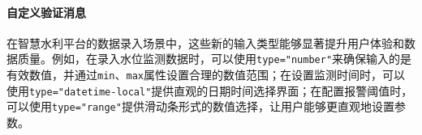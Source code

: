 \begin{Shaded}
\begin{Highlighting}[]
\DataTypeTok{\textless{}}\OperatorTok{=}\OperatorTok{=}\DataTypeTok{\textgreater{}}

\DataTypeTok{\textless{}}\OperatorTok{=}\OperatorTok{=}\OperatorTok{=}\OperatorTok{=}\DataTypeTok{\textgreater{}}

\DataTypeTok{\textless{}}\OperatorTok{=}\OtherTok{ }
\OperatorTok{=}\OtherTok{ }
\OperatorTok{=}\OtherTok{ }
\OperatorTok{=}\DataTypeTok{\textgreater{}}
\end{Highlighting}
\end{Shaded}

\paragraph{自定义验证消息}\label{ux81eaux5b9aux4e49ux9a8cux8bc1ux6d88ux606f}

\begin{Shaded}
\begin{Highlighting}[]
\DataTypeTok{\textless{}}\OperatorTok{=}\OtherTok{ }
\OperatorTok{=}\OtherTok{ }
\OperatorTok{=}\OtherTok{ }
\OperatorTok{=}
\OperatorTok{=}\DataTypeTok{\textgreater{}}
\end{Highlighting}
\end{Shaded}

在智慧水利平台的数据录入场景中，这些新的输入类型能够显著提升用户体验和数据质量。例如，在录入水位监测数据时，可以使用\texttt{type="number"}来确保输入的是有效数值，并通过\texttt{min}、\texttt{max}属性设置合理的数值范围；在设置监测时间时，可以使用\texttt{type="datetime-local"}提供直观的日期时间选择界面；在配置报警阈值时，可以使用\texttt{type="range"}提供滑动条形式的数值选择，让用户能够更直观地设置参数。

